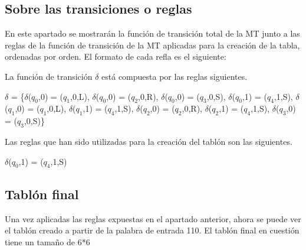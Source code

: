 ﻿\documentclass[a4paper,10pt]{article}
\begin{document}
\subsection{Sobre las transiciones o reglas}
En este apartado se mostrarán la función de transición total de la MT junto a las reglas de la función de transición de la MT aplicadas para la creación de la tabla, ordenadas por orden. El formato de cada refla es el siguiente: \newline\par 
{} \newline\par 
La función de transición $\delta$ está compuesta por las reglas siguientes.\newline\newline 
\begin{flushright}$\delta$ = \{$\delta$($q_0$,0) = ($q_1$,0,L), \newline
$\delta$($q_0$,0) = ($q_2$,0,R), \newline
$\delta$($q_0$,0) = ($q_3$,0,S), \newline
$\delta$($q_0$,1) = ($q_4$,1,S), \newline
$\delta$($q_1$,0) = ($q_1$,0,L), \newline
$\delta$($q_1$,1) = ($q_4$,1,S), \newline
$\delta$($q_2$,0) = ($q_2$,0,R), \newline
$\delta$($q_2$,1) = ($q_4$,1,S), \newline
$\delta$($q_3$,0) = ($q_3$,0,S)\}\newline
\end{flushright}\par 
Las reglas que han sido utilizadas para la creación del tablón son las siguientes.\newline\newline 
\begin{flushright}$\delta$($q_0$,1) = ($q_4$,1,S)\newline
\end{flushright}\subsection{Tablón final}
Una vez aplicadas las reglas expuestas en el apartado anterior, ahora se puede ver el tablón creado a partir de la palabra de entrada 110.
El tablón final en cuestión tiene un tamaño de 6*6\newline\par
\end{document}
